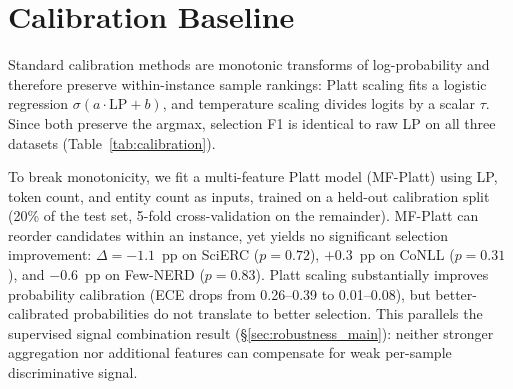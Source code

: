 \section{Calibration Baseline}\label{app:calibration_baseline}

Standard calibration methods are monotonic transforms of log-probability and therefore preserve within-instance sample rankings: Platt scaling \cite{platt1999probabilistic} fits a logistic regression $\sigma(a \cdot \text{LP} + b)$, and temperature scaling \cite{guo2017calibration} divides logits by a scalar $\tau$.
Since both preserve the argmax, selection F1 is identical to raw LP on all three datasets (Table~\ref{tab:calibration}).

To break monotonicity, we fit a multi-feature Platt model (MF-Platt) using LP, token count, and entity count as inputs, trained on a held-out calibration split (20\% of the test set, 5-fold cross-validation on the remainder).
MF-Platt can reorder candidates within an instance, yet yields no significant selection improvement: $\Delta{=}{-}1.1$~pp on SciERC ($p{=}0.72$), $+0.3$~pp on CoNLL ($p{=}0.31$), and $-0.6$~pp on Few-NERD ($p{=}0.83$).
Platt scaling substantially improves probability calibration (ECE drops from 0.26--0.39 to 0.01--0.08), but better-calibrated probabilities do not translate to better selection.
This parallels the supervised signal combination result (\S\ref{sec:robustness_main}): neither stronger aggregation nor additional features can compensate for weak per-sample discriminative signal.

\begin{table}[t]
\centering
\small
\caption{Calibration baseline results ($T{=}1.0$; single seed). SciERC uses $N{=}8$; CoNLL and Few-NERD use $N{=}16$ ($N$ does not affect greedy F1 or calibration conclusions). Platt and TempScale are monotonic transforms of LP that preserve the within-instance argmax (selection F1 $\equiv$ Raw LP, omitted). MF-Platt uses LP $+$ token count $+$ entity count; $p$: bootstrap test vs.\ Raw LP. Few-NERD evaluated on the first 5K test instances without gold-filtering (greedy .771; cf.\ gold-filtered full-set .748 in Table~\ref{tab:fewnerd}).}
\label{tab:calibration}
\end{table}

